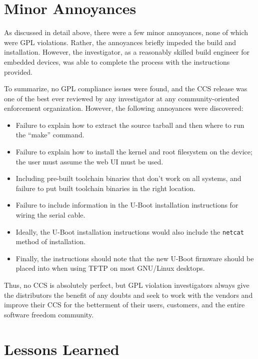 \section{Minor Annoyances}

As discussed in detail above, there were a few minor annoyances, none of
which were GPL violations.  Rather, the annoyances briefly impeded the
build and installation.  However, the investigator, as a reasonably skilled
build engineer for embedded devices, was able to complete the process with
the instructions provided.

To summarize, no GPL compliance issues were found, and the CCS release was
one of the best ever reviewed by any investigator at any community-oriented
enforcement organization.  However, the following annoyances were discovered:

\begin{itemize}
\item Failure to explain how to extract the source tarball and then where to run the
  ``make'' command.
\item Failure to explain how to install the kernel and root filesystem on the
  device; the user must assume the web UI must be used.

\item Including pre-built toolchain binaries that don't work on all systems,
  and failure to put built toolchain binaries in the right location.

\item Failure to include information in the U-Boot installation instructions for
  wiring the serial cable.

\item Ideally, the U-Boot installation instructions would also include the
  {\tt netcat} method of installation.

\item Finally, the instructions should note that the new U-Boot firmware
  should be placed into  when using TFTP on most GNU/Linux
  desktops.
\end{itemize}

Thus, no CCS is absolutely perfect, but GPL violation investigators always
give the distributors the benefit of any doubts and seek to work with the
vendors and improve their CCS for the betterment of their users, customers,
and the entire software freedom community.

\section{Lessons Learned}

